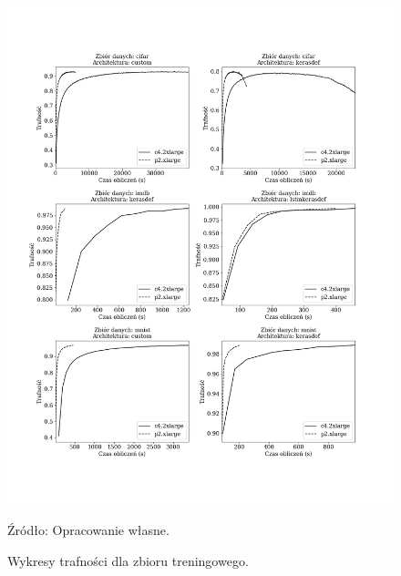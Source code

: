 \documentclass[12pt,a4paper,twoside]{article}
\newcommand{\source}[1]{\caption*{\hfill Źródło: {#1}} }
\begin{document}
\begin{figure}[h]
  \centering
\includegraphics[scale=0.5]{../obrazy/fig:experiment_acc.png}
\caption{Wykresy trafności dla zbioru treningowego.\label{fig:experiment_acc}}
\source{Opracowanie własne.}
\end{figure}
\end{document}
